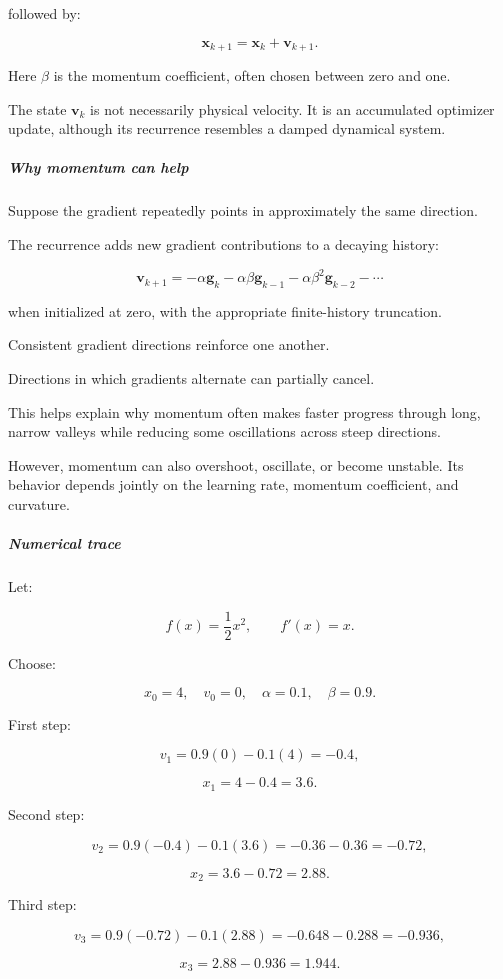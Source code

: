 followed by:

\[
\boxed{ \mathbf x_{k+1}=\mathbf x_k+\mathbf v_{k+1} }.
\]

Here \(\beta\) is the momentum coefficient, often chosen between zero and one.

The state \(\mathbf v_k\) is not necessarily physical velocity. It is an accumulated optimizer update, although its recurrence resembles a damped dynamical system.

\subparagraph{Why momentum can help}\label{why-momentum-can-help}

Suppose the gradient repeatedly points in approximately the same direction.

The recurrence adds new gradient contributions to a decaying history:

\[
\mathbf v_{k+1} = -\alpha\mathbf g_k -\alpha\beta\mathbf g_{k-1} -\alpha\beta^2\mathbf g_{k-2} -\cdots
\]

when initialized at zero, with the appropriate finite-history truncation.

Consistent gradient directions reinforce one another.

Directions in which gradients alternate can partially cancel.

This helps explain why momentum often makes faster progress through long, narrow valleys while reducing some oscillations across steep directions.

However, momentum can also overshoot, oscillate, or become unstable. Its behavior depends jointly on the learning rate, momentum coefficient, and curvature.

\subparagraph{Numerical trace}\label{numerical-trace}

Let:

\[
f(x)=\frac12x^2,\qquad f'(x)=x.
\]

Choose:

\[
x_0=4,\quad v_0=0,\quad\alpha=0.1,\quad\beta=0.9.
\]

First step:

\[
v_1=0.9(0)-0.1(4)=-0.4,
\]

\[
x_1=4-0.4=3.6.
\]

Second step:

\[
v_2=0.9(-0.4)-0.1(3.6) =-0.36-0.36=-0.72,
\]

\[
x_2=3.6-0.72=2.88.
\]

Third step:

\[
v_3=0.9(-0.72)-0.1(2.88) =-0.648-0.288=-0.936,
\]

\[
x_3=2.88-0.936=1.944.
\]

